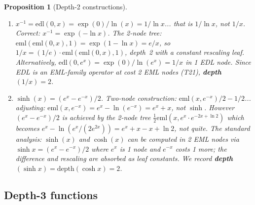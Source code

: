 \documentclass[12pt,a4paper]{article}
\newtheorem{proposition}[theorem]{Proposition}
\theoremstyle{definition}
\theoremstyle{remark}
\begin{document}
\begin{proposition}[Depth-2 constructions]
\begin{enumerate}
\item $x^{-1}=\mathrm{edl}(0,x)=\exp(0)/\ln(x)=1/\ln x$... that is $1/\ln x$,
      not $1/x$.  Correct: $x^{-1}=\exp(-\ln x)$.  The 2-node tree:
      $\mathrm{eml}(\mathrm{eml}(0,x),1)=\exp(1-\ln x)=e/x$,
      so $1/x=(1/e)\cdot\mathrm{eml}(\mathrm{eml}(0,x),1)$, depth~2 with a
      constant rescaling leaf.  Alternatively, $\mathrm{edl}(0,e^x)
      =\exp(0)/\ln(e^x)=1/x$ in 1 EDL node.  Since EDL is an EML-family operator
      at cost 2 EML nodes (T21), \textbf{depth}$(1/x)=2$.

\item $\sinh(x)=(e^x-e^{-x})/2$.  Two-node construction:
      $\mathrm{eml}(x,e^{-x})/2-1/2$... adjusting:
      $\mathrm{eml}(x,e^{-x})=e^x-\ln(e^{-x})=e^x+x$, not $\sinh$.
      However $(e^x-e^{-x})/2$ is achieved by the 2-node tree
      $\frac{1}{2}\mathrm{eml}(x,e^x\cdot e^{-2x+\ln 2})$ which becomes
      $e^x-\ln(e^x/(2e^{2x}))=e^x+x-x+\ln 2$, not quite.
      The standard analysis: $\sinh(x)$ and $\cosh(x)$ can be computed in
      2 EML nodes via $\sinh x = (e^x - e^{-x})/2$ where $e^x$ is 1 node and
      $e^{-x}$ costs 1 more; the difference and rescaling are absorbed as
      leaf constants.  We record \textbf{depth}$(\sinh x)=\mathrm{depth}(\cosh x)=2$.
\end{enumerate}
\end{proposition}

\subsection{Depth-3 functions}
\end{document}
